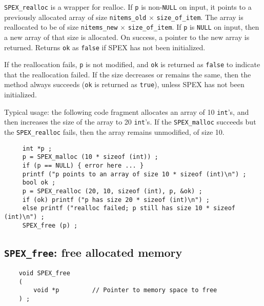 \documentclass[12pt]{report}
\theoremstyle{definition}
\begin{document}
\verb|SPEX_realloc| is a wrapper for realloc.  If \verb|p| is non-\verb|NULL| on
input, it points to a previously allocated array of size \verb|nitems_old|
$\times$ \verb|size_of_item|.  The array is reallocated to be of size
\verb|nitems_new| $\times$ \verb|size_of_item|.  If \verb|p| is \verb|NULL| on input,
then a new array of that size is allocated.  On success, a pointer to the new
array is returned.  Returns \verb|ok| as \verb|false| if SPEX has not been
initialized.

If the reallocation fails, \verb|p| is not modified, and \verb|ok| is returned
as \verb|false| to indicate that the reallocation failed.  If the size
decreases or remains the same, then the method always succeeds (\verb|ok| is
returned as \verb|true|), unless SPEX has not been initialized.

Typical usage:  the following code fragment allocates an array of 10
\verb|int|'s, and then increases the size of the array to 20 \verb|int|'s.  If
the \verb|SPEX_malloc| succeeds but the \verb|SPEX_realloc| fails, then the
array remains unmodified, of size 10.

\begin{mdframed}[userdefinedwidth=6in]
{\footnotesize
\begin{verbatim}
     int *p ;
     p = SPEX_malloc (10 * sizeof (int)) ;
     if (p == NULL) { error here ... }
     printf ("p points to an array of size 10 * sizeof (int)\n") ;
     bool ok ;
     p = SPEX_realloc (20, 10, sizeof (int), p, &ok) ;
     if (ok) printf ("p has size 20 * sizeof (int)\n") ;
     else printf ("realloc failed; p still has size 10 * sizeof (int)\n") ;
     SPEX_free (p) ;
\end{verbatim}
} \end{mdframed}

\cprotect\subsection{\verb|SPEX_free|: free allocated memory}
\label{ss:SPEX_free}

\begin{mdframed}[userdefinedwidth=6in]
{\footnotesize
\begin{verbatim}
    void SPEX_free
    (
        void *p         // Pointer to memory space to free
    ) ;
\end{verbatim}
} \end{mdframed}
\end{document}
